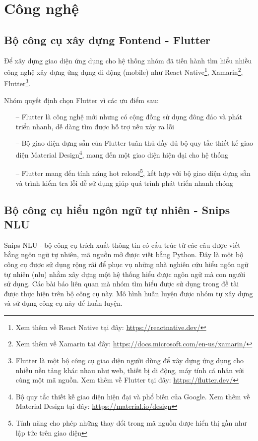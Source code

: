 \section{Công nghệ}

\subsection{Bộ công cụ xây dựng Fontend - Flutter}
Để xây dựng giao diện ứng dụng cho hệ thống nhóm đã tiến hành tìm hiểu nhiều công nghệ xây dựng ứng dụng di động (mobile) như React Native\footnote{Xem thêm về React Native tại đây: \url{https://reactnative.dev/}}, Xamarin\footnote{Xem thêm về Xamarin tại đây: \url{https://docs.microsoft.com/en-us/xamarin/}}, Flutter\footnote{Flutter là một bộ công cụ giao diện người dùng để xây dựng ứng dụng cho nhiều nền tảng khác nhau như web, thiết bị di động, máy tính cá nhân với cùng một mã nguồn. Xem thêm về Flutter tại đây: \url{https://flutter.dev/}}.

Nhóm quyết định chọn Flutter vì các ưu điểm sau:
\begin{itemize}
    \item[--] Flutter là công nghệ mới nhưng có cộng đồng sử dụng đông đảo và phát triển nhanh, dễ dàng tìm được hỗ trợ nếu xảy ra lỗi
    \item[--] Bộ giao diện dựng sẵn của Flutter tuân thủ đầy đủ bộ quy tắc thiết kế giao diện Material Design\footnote{Bộ quy tắc thiết kế giao diện hiện đại và phổ biến của Google. Xem thêm về Material Design tại đây: \url{https://material.io/design}}, mang đến một giao diện hiện đại cho hệ thống
    \item[--] Flutter mang đến tính năng hot reload\footnote{Tính năng cho phép những thay đổi trong mã nguồn được hiển thị gần như lập tức trên giao diện}, kết hợp với bộ giao diện dựng sẵn và trình kiểm tra lỗi dễ sử dụng giúp quá trình phát triển nhanh chóng
\end{itemize}

\subsection{Bộ công cụ hiểu ngôn ngữ tự nhiên - Snips NLU}
Snips NLU - bộ công cụ trích xuất thông tin có cấu trúc từ các câu được viết bằng ngôn ngữ tự nhiên, mã nguồn mở được viết bằng Python.
Đây là một bộ công cụ được sử dụng rộng rãi để phục vụ những nhà nghiên cứu hiểu ngôn ngữ tự nhiên (\ac{nlu}) nhằm xây dựng một hệ thống hiểu được ngôn ngữ mà con người sử dụng. Các bài báo liên quan mà nhóm tìm hiểu được sử dụng trong đề tài được thực hiện trên bộ công cụ này. Mô hình huấn luyện được nhóm tự xây dựng và sử dụng công cụ này để huấn luyện.

